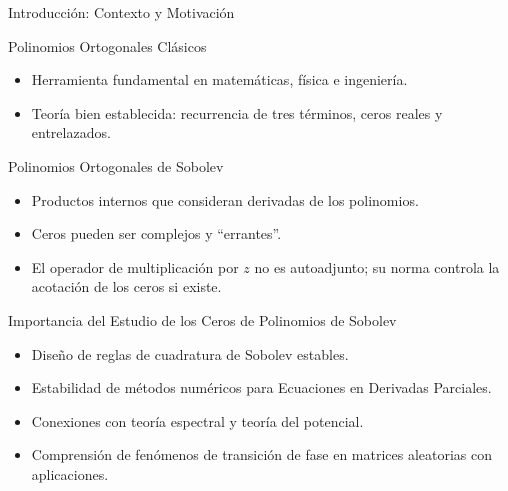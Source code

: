 \begin{frame}{Introducción: Contexto y Motivación}
	\footnotesize
	\begin{block}{\footnotesize Polinomios Ortogonales Clásicos}
		\begin{itemize}
			\item Herramienta fundamental en matemáticas, física e ingeniería.
			\item Teoría bien establecida: recurrencia de tres términos, ceros reales y entrelazados.
		\end{itemize}
	\end{block}
	\pause
	\begin{alertblock}{\footnotesize Polinomios Ortogonales de Sobolev} %
		\begin{itemize}
			\item Productos internos que consideran derivadas de los polinomios.
			\item Ceros pueden ser complejos y ``errantes''.
			\item El operador de multiplicación por $z$ no es autoadjunto; su norma controla la acotación de los ceros si existe.

		\end{itemize}
	\end{alertblock}
	\begin{block}{\footnotesize Importancia del Estudio de los Ceros de Polinomios de Sobolev} \footnotesize %
		\begin{itemize}
			\item Diseño de reglas de cuadratura  de Sobolev estables.
			\item Estabilidad de métodos numéricos para Ecuaciones en Derivadas Parciales.
			\item Conexiones con teoría espectral y teoría del potencial.
			\item Comprensión de fenómenos de transición de fase en matrices aleatorias con aplicaciones.
		\end{itemize}
	\end{block}
\end{frame}

